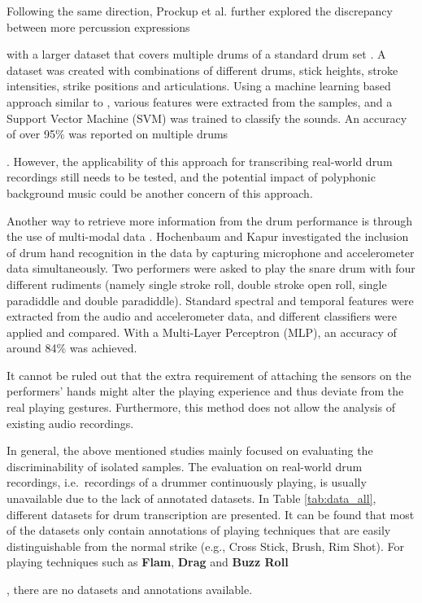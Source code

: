 \documentclass{article}
\begin{document}
Following the same direction, Prockup et al. further explored the discrepancy between more percussion expressions {\color{red}{now is it gestures or technique or expression?} with a larger dataset that covers multiple drums of a standard drum set \cite{Prockup2013}. A dataset was created with combinations of different drums, stick heights, stroke intensities, strike positions and articulations. Using a machine learning based approach similar to \cite{Tindale2004}, various features were extracted from the samples, and a Support Vector Machine (SVM) was trained to classify the sounds. An accuracy of over 95\% was reported on multiple drums{\color{red}{more specifics? How many classes, what features}. However, the applicability of this approach for transcribing real-world drum recordings still needs to be tested, and the potential impact of polyphonic background music could be another concern of this approach.
 
Another way to retrieve more information from the drum performance is through the use of multi-modal data \cite{Hochenbaum2011}. Hochenbaum and Kapur investigated the inclusion of drum hand recognition in the data by capturing microphone and accelerometer data simultaneously. Two performers were asked to play the snare drum with four different rudiments (namely single stroke roll, double stroke open roll, single paradiddle and double paradiddle). Standard spectral and temporal features were extracted from the audio and accelerometer data, and different classifiers were applied and compared. With a Multi-Layer Perceptron (MLP), an accuracy of around 84\% was achieved. {\color{red}{again,more info on features and classes?} It cannot be ruled out that the extra requirement of attaching the sensors on the performers' hands might alter the playing experience and thus deviate from the real playing gestures. Furthermore, this method does not allow the analysis of existing audio recordings. 

In general, the above mentioned studies mainly focused on evaluating the discriminability of isolated samples. The evaluation on real-world drum recordings, i.e.\ recordings of a drummer continuously playing, is usually unavailable due to the lack of annotated datasets. In Table \ref{tab:data_all}, different datasets for drum transcription are presented. It can be found that most of the datasets only contain annotations of playing techniques that are easily distinguishable from the normal strike (e.g., Cross Stick, Brush, Rim Shot). For playing techniques such as \textbf{Flam}, \textbf{Drag} and \textbf{Buzz Roll} {\color{red}{why bold? --- is this the introduction of your classes. Then do it more systematically in Method}, there are no datasets and annotations available. 

}}}}
\end{document}
